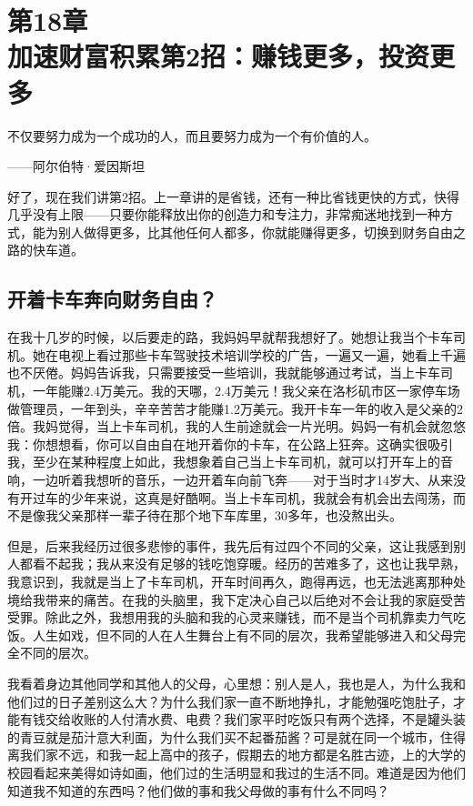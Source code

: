 
\section[第18章\q 加速财富积累第2招：赚钱更多，投资更多]{第18章\\ 加速财富积累第2招：赚钱更多，投资更多}

\begin{BookQuote}
不仅要努力成为一个成功的人，而且要努力成为一个有价值的人。

\hfill ——阿尔伯特·爱因斯坦
\end{BookQuote}

好了，现在我们讲第2招。上一章讲的是省钱，还有一种比省钱更快的方式，快得几乎没有上限——只要你能释放出你的创造力和专注力，非常痴迷地找到一种方式，能为别人做得更多，比其他任何人都多，你就能赚得更多，切换到财务自由之路的快车道。

\subsection{开着卡车奔向财务自由？}

在我十几岁的时候，以后要走的路，我妈妈早就帮我想好了。她想让我当个卡车司机。她在电视上看过那些卡车驾驶技术培训学校的广告，一遍又一遍，她看上千遍也不厌倦。妈妈告诉我，只需要接受一些培训，我就能够通过考试，当上卡车司机，一年能赚2.4万美元。我的天哪，2.4万美元！我父亲在洛杉矶市区一家停车场做管理员，一年到头，辛辛苦苦才能赚1.2万美元。我开卡车一年的收入是父亲的2倍。我妈觉得，当上卡车司机，我的人生前途就会一片光明。妈妈一有机会就忽悠我：你想想看，你可以自由自在地开着你的卡车，在公路上狂奔。这确实很吸引我，至少在某种程度上如此，我想象着自己当上卡车司机，就可以打开车上的音响，一边听着我想听的音乐，一边开着车向前飞奔——对于当时才14岁大、从来没有开过车的少年来说，这真是好酷啊。当上卡车司机，我就会有机会出去闯荡，而不是像我父亲那样一辈子待在那个地下车库里，30多年，也没熬出头。

但是，后来我经历过很多悲惨的事件，我先后有过四个不同的父亲，这让我感到别人都看不起我；我从来没有足够的钱吃饱穿暖。经历的苦难多了，这也让我早熟，我意识到，我就是当上了卡车司机，开车时间再久，跑得再远，也无法逃离那种处境给我带来的痛苦。在我的头脑里，我下定决心自己以后绝对不会让我的家庭受苦受罪。除此之外，我想用我的头脑和我的心灵来赚钱，而不是当个司机靠卖力气吃饭。人生如戏，但不同的人在人生舞台上有不同的层次，我希望能够进入和父母完全不同的层次。

我看着身边其他同学和其他人的父母，心里想：别人是人，我也是人，为什么我和他们过的日子差别这么大？为什么我们家一直不断地挣扎，才能勉强吃饱肚子，才能有钱交给收账的人付清水费、电费？我们家平时吃饭只有两个选择，不是罐头装的青豆就是茄汁意大利面，为什么我们买不起番茄酱？可是就在同一个城市，住得离我们家不远，和我一起上高中的孩子，假期去的地方都是名胜古迹，上的大学的校园看起来美得如诗如画，他们过的生活明显和我过的生活不同。难道是因为他们知道我不知道的东西吗？他们做的事和我父母做的事有什么不同吗？


